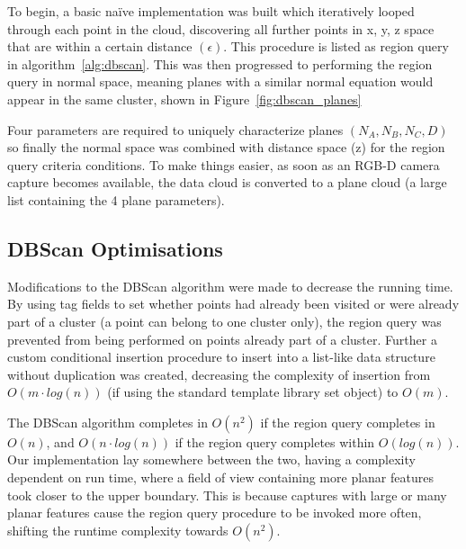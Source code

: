 \documentclass[]{article}
\begin{document}
{To begin, a basic naïve implementation was built which iteratively looped through each point in the cloud, discovering all further points in x, y, z space that are within a certain distance  $(\epsilon)$. This procedure is listed as region query in algorithm~\ref{alg:dbscan}. This was then progressed to performing the region query in normal space, meaning planes with a similar normal equation would appear in the same cluster, shown in Figure~\ref{fig:dbscan_planes}



Four parameters are required to uniquely characterize planes $(N_A, N_B, N_C, D)$ so finally the normal space was combined with distance space (z) for the region query criteria conditions. To make things easier, as soon as an RGB-D camera capture becomes available, the data cloud is converted to a plane cloud (a large list containing the 4 plane parameters).

\subsection{DBScan Optimisations} %
\label{sub:dbscan_optimisations}


Modifications to the DBScan algorithm were made to decrease the running time. By using tag fields to set whether points had already been visited or were already part of a cluster (a point can belong to one cluster only), the region query was prevented from being performed on points already part of a cluster. Further a custom conditional insertion procedure to insert into a list-like data structure without duplication was created, decreasing the complexity of insertion from $O(m \cdot log(n))$ (if using the standard template library set object) to $O(m)$.

The DBScan algorithm completes in $O(n^2)$ if the region query completes in $O(n)$, and $O(n \cdot log(n))$ if the region query completes within $O(log(n))$. Our implementation lay somewhere between the two, having a complexity dependent on run time, where a field of view containing more planar features took closer to the upper boundary. This is because captures with large or many planar features cause the region query procedure to be invoked more often, shifting the runtime complexity towards $O(n^2)$.

}
\end{document}
